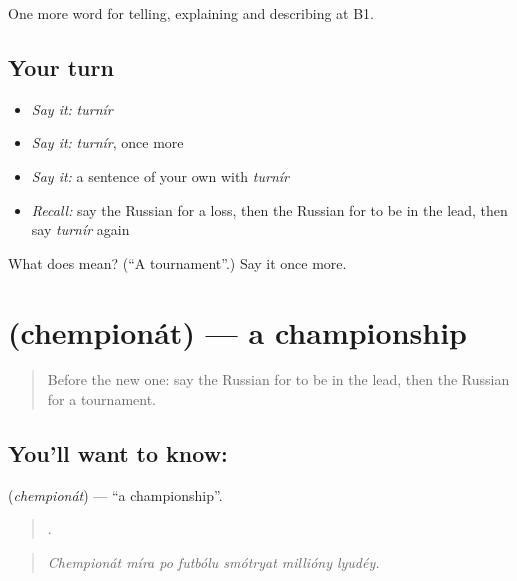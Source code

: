 \begin{grammarlens}[title={What you've built}]
One more word for telling, explaining and describing at B1.
\end{grammarlens}

\subsection*{Your turn}
\begin{itemize}
\raggedright
  \item \emph{Say it:} \emph{turnír}
  \item \emph{Say it:} \emph{turnír}, once more
  \item \emph{Say it:} a sentence of your own with \emph{turnír}
  \item \emph{Recall:} say the Russian for a loss, then the Russian for to be in the lead, then say \emph{turnír} again
\end{itemize}

\begin{tcolorbox}[breakable,colback=teal!4,colframe=teal!35!black,title={Before you move on}]
What does  mean? (\textquotedblleft{}A tournament\textquotedblright{}.) Say it once more.
\end{tcolorbox}
\section[\texorpdfstring{\ru{чемпионат} (chempionát)}{чемпионат (chempionát)}]{ (chempionát) — a championship}

\label{lesson:RU-C511-chempionat}



\begin{quote}
Before the new one: say the Russian for to be in the lead, then the Russian for a tournament.
\end{quote}

\subsection*{You'll want to know: }
\textbf{} (\emph{chempionát}) — \textquotedblleft{}a championship\textquotedblright{}.

\begin{quote}
      .
\end{quote}

\begin{quote}
\emph{Chempionát míra po futbólu smótryat millióny lyudéy.}
\end{quote}

